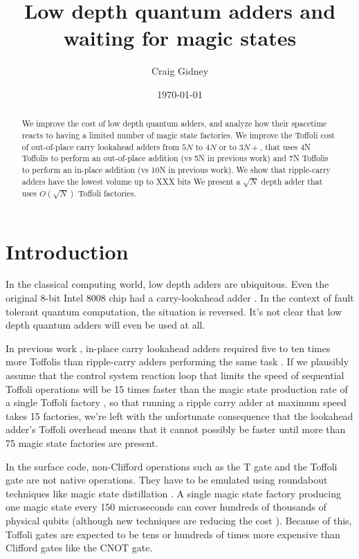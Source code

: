 \documentclass[onecolumn,unpublished]{quantumarticle}
\title{Low depth quantum adders and waiting for magic states}
\date{\today}
\author{Craig Gidney}
\affiliation{Google Inc., Santa Barbara, California 93117, USA}
\theoremstyle{definition}
\theoremstyle{definition}
\theoremstyle{definition}
\begin{document}
\maketitle

\begin{abstract}
    We improve the cost of low depth quantum adders, and analyze how their spacetime reacts to having a limited number of magic state factories.
    We improve the Toffoli cost of out-of-place carry lookahead adders from $5N$ to $4N$ or to $3N + $, that uses 4N Toffolis to perform an out-of-place addition (vs 5N in previous work) and 7N Toffolis to perform an in-place addition (vs 10N in previous work).
    We show that ripple-carry adders have the lowest volume up to XXX bits
    We present a $\sqrt{N}$ depth adder that uses $O(\sqrt{N})$ Toffoli factories.
\end{abstract}

\section{Introduction}

In the classical computing world, low depth adders are ubiquitous.
Even the original 8-bit Intel 8008 chip had a carry-lookahead adder \cite{shirriff2020reverseengineer8008}.
In the context of fault tolerant quantum computation, the situation is reversed.
It's not clear that low depth quantum adders will even be used at all.

In previous work \cite{draper2004lookaheadadder}, in-place carry lookahead adders required five to ten times more Toffolis than ripple-carry adders performing the same task \cite{cuccaro2004adder,gidney2018halving}.
If we plausibly assume that the control system reaction loop that limits the speed of sequential Toffoli operations will be 15 times faster than the magic state production rate of a single Toffoli factory \cite{gidney2019autoccz}, so that running a ripple carry adder at maximum speed takes 15 factories, we're left with the unfortunate consequence that the lookahead adder's Toffoli overhead means that it cannot possibly be faster until more than 75 magic state factories are present.

In the surface code, non-Clifford operations such as the T gate and the Toffoli gate are not native operations.
They have to be emulated using roundabout techniques like magic state distillation \cite{bravyi2005magicstate}.
A single magic state factory producing one magic state every 150 microseconds can cover hundreds of thousands of physical qubits \cite{gidney2019catalyzed} (although new techniques are reducing the cost \cite{litinski2019magicnotcostly}).
Because of this, Toffoli gates are expected to be tens or hundreds of times more expensive than Clifford gates like the CNOT gate.
\end{document}
